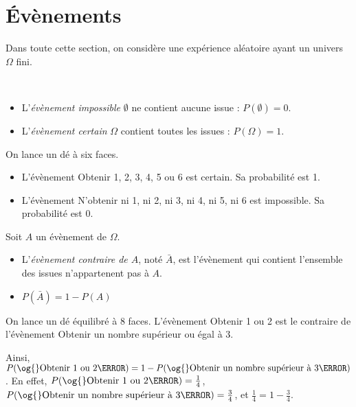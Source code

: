 \section{Évènements}

\begin{em}
\noindent Dans toute cette section, on considère une expérience aléatoire ayant un
  univers $\Omega$ fini.
\end{em}

\begin{defprop}~
  \begin{itemize}
    \item L'\emph{évènement impossible} $\emptyset$ ne contient aucune issue : $P(\emptyset)=0$.
    \item L'\emph{évènement certain} $\Omega$ contient toutes les issues : $P(\Omega)=1$.
  \end{itemize}
\end{defprop}

\begin{exemple}On lance un dé à six faces.
  \begin{itemize}
    \item L'évènement \og{}Obtenir 1, 2, 3, 4, 5 ou 6\fg{} est certain. Sa probabilité est 1.
    \item L'évènement \og{}N'obtenir ni 1, ni 2, ni 3, ni 4, ni 5, ni 6\fg{} est impossible. Sa probabilité est 0.
  \end{itemize}
\end{exemple}

\begin{defprop}Soit $A$ un évènement de $\Omega$.
  \begin{itemize}
    \item L'\emph{évènement contraire de $A$}, noté $\bar A$, est l'évènement qui contient l'ensemble des issues n'appartenent pas à $A$.
    \item $P(\bar A)=1-P(A)$
  \end{itemize}
\end{defprop}

\begin{exemple}On lance un dé équilibré à 8 faces. L'évènement \og{}Obtenir 1 ou
  2\fg{} est le contraire de l'évènement \og{}Obtenir un nombre supérieur ou égal à
  3\fg{}.

  Ainsi, $P(\text{\og{}Obtenir 1 ou 2\fg{}}) = 1 - P(\text{\og{}Obtenir un nombre supérieur à 3\fg{}})$. En effet,
  $P(\text{\og{}Obtenir 1 ou 2\fg{}})=\frac{1}{4}$, $P(\text{\og{}Obtenir un nombre
  supérieur à 3\fg{}})=\frac{3}{4}$, et $\frac{1}{4}=1-\frac{3}{4}$.
\end{exemple}

